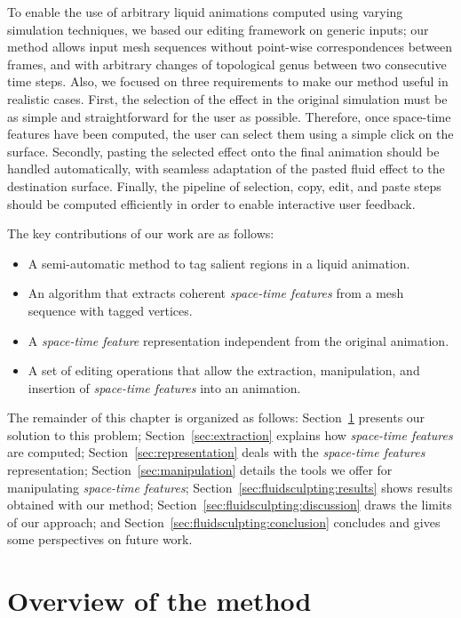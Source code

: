 To enable the use of arbitrary liquid animations computed using varying simulation techniques, we based our editing framework on generic inputs; 
our method allows input mesh sequences without point-wise correspondences between frames, and with arbitrary changes of topological genus between two consecutive time steps.
Also, we focused on three requirements to make our method useful in realistic cases.
First, the selection of the effect in the original simulation must be as simple and straightforward for the user as possible. 
Therefore, once space-time features have been computed, the user can select them using a simple click on the surface.
Secondly, pasting the selected effect onto the final animation should be handled automatically, with seamless adaptation of the pasted fluid effect to the destination surface. 
Finally, the pipeline of selection, copy, edit, and paste steps should be computed efficiently in order to enable interactive user feedback. 

The key contributions of our work are as follows:
\begin{itemize}
    \item A semi-automatic method to tag salient regions in a liquid animation.
    \item An algorithm that extracts coherent \emph{space-time features} from a mesh sequence with tagged vertices.
    \item A \emph{space-time feature} representation independent from the original animation.
    \item A set of editing operations that allow the extraction, manipulation, and insertion of \emph{space-time features} into an animation.
\end{itemize}

The remainder of this chapter is organized as follows:
Section~\ref{sec:overview} presents our solution to this problem;
Section~\ref{sec:extraction} explains how \emph{space-time features} are computed; 
Section~\ref{sec:representation} deals with the \emph{space-time features} representation; 
Section~\ref{sec:manipulation} details the tools we offer for manipulating \emph{space-time features}; 
Section~\ref{sec:fluidsculpting:results} shows results obtained with our method; 
Section~\ref{sec:fluidsculpting:discussion} draws the limits of our approach; 
and Section~\ref{sec:fluidsculpting:conclusion} concludes and gives some perspectives on future work.

\section{Overview of the method}\label{sec:overview}

